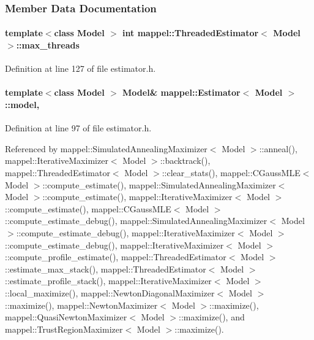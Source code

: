 \subsubsection{Member Data Documentation}
\paragraph[{\texorpdfstring{max\+\_\+threads}{max_threads}}]{\setlength{\rightskip}{0pt plus 5cm}template$<$class Model $>$ int {\bf mappel\+::\+Threaded\+Estimator}$<$ Model $>$\+::max\+\_\+threads\hspace{0.3cm}{\ttfamily [protected]}}\hypertarget{classmappel_1_1ThreadedEstimator_a31391f8aaab3484f58bfdedbdb22be42}{}\label{classmappel_1_1ThreadedEstimator_a31391f8aaab3484f58bfdedbdb22be42}


Definition at line 127 of file estimator.\+h.

\paragraph[{\texorpdfstring{model}{model}}]{\setlength{\rightskip}{0pt plus 5cm}template$<$class Model $>$ Model\& {\bf mappel\+::\+Estimator}$<$ Model $>$\+::model\hspace{0.3cm}{\ttfamily [protected]}, {\ttfamily [inherited]}}\hypertarget{classmappel_1_1Estimator_a8322546d87ccdf01f8b0dcd9dae509f0}{}\label{classmappel_1_1Estimator_a8322546d87ccdf01f8b0dcd9dae509f0}


Definition at line 97 of file estimator.\+h.



Referenced by mappel\+::\+Simulated\+Annealing\+Maximizer$<$ Model $>$\+::anneal(), mappel\+::\+Iterative\+Maximizer$<$ Model $>$\+::backtrack(), mappel\+::\+Threaded\+Estimator$<$ Model $>$\+::clear\+\_\+stats(), mappel\+::\+C\+Gauss\+M\+L\+E$<$ Model $>$\+::compute\+\_\+estimate(), mappel\+::\+Simulated\+Annealing\+Maximizer$<$ Model $>$\+::compute\+\_\+estimate(), mappel\+::\+Iterative\+Maximizer$<$ Model $>$\+::compute\+\_\+estimate(), mappel\+::\+C\+Gauss\+M\+L\+E$<$ Model $>$\+::compute\+\_\+estimate\+\_\+debug(), mappel\+::\+Simulated\+Annealing\+Maximizer$<$ Model $>$\+::compute\+\_\+estimate\+\_\+debug(), mappel\+::\+Iterative\+Maximizer$<$ Model $>$\+::compute\+\_\+estimate\+\_\+debug(), mappel\+::\+Iterative\+Maximizer$<$ Model $>$\+::compute\+\_\+profile\+\_\+estimate(), mappel\+::\+Threaded\+Estimator$<$ Model $>$\+::estimate\+\_\+max\+\_\+stack(), mappel\+::\+Threaded\+Estimator$<$ Model $>$\+::estimate\+\_\+profile\+\_\+stack(), mappel\+::\+Iterative\+Maximizer$<$ Model $>$\+::local\+\_\+maximize(), mappel\+::\+Newton\+Diagonal\+Maximizer$<$ Model $>$\+::maximize(), mappel\+::\+Newton\+Maximizer$<$ Model $>$\+::maximize(), mappel\+::\+Quasi\+Newton\+Maximizer$<$ Model $>$\+::maximize(), and mappel\+::\+Trust\+Region\+Maximizer$<$ Model $>$\+::maximize().

